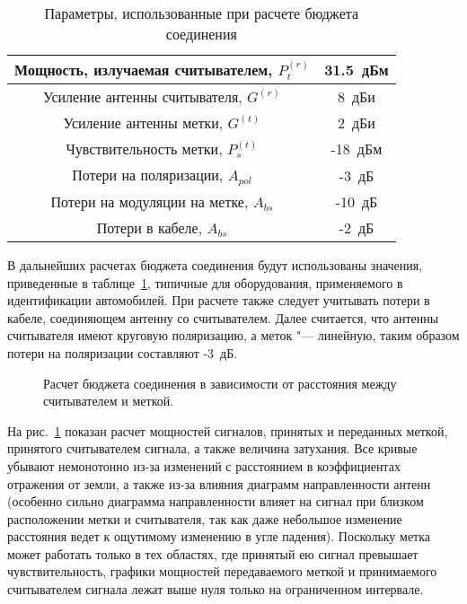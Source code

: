 \begin{table}[!t]
	\renewcommand{\arraystretch}{1.3}
	\caption{Параметры, использованные при расчете бюджета соединения}
	\label{table:ch2_budget_params}
	\centering
	\begin{tabular}{|c|c|}
		\hline
		Мощность, излучаемая считывателем, $P_t^{(r)}$ & 31.5~дБм\\
		\hline
		Усиление антенны считывателя, $G^{(r)}$ & 8~дБи\\
		\hline
		Усиление антенны метки, $G^{(t)}$ & 2~дБи\\
		\hline
		Чувствительность метки, $P_s^{(t)}$ & -18~дБм\\
		\hline
		Потери на поляризации, $A_{pol}$ & -3~дБ\\
		\hline
		Потери на модуляции на метке, $A_{bs}$ & -10~дБ\\
		\hline
		Потери в кабеле, $A_{bs}$ & -2~дБ\\
		\hline
	\end{tabular}
\end{table}

В дальнейших расчетах бюджета соединения будут использованы значения, приведенные в таблице~\ref{table:ch2_budget_params}, типичные для оборудования, применяемого в идентификации автомобилей. При расчете также следует учитывать потери в кабеле, соединяющем антенну со считывателем. Далее считается, что антенны считывателя имеют круговую поляризацию, а меток "--- линейную, таким образом потери на поляризации составляют -3~дБ.

\begin{figure}[!t]
  \caption{Расчет бюджета соединения в зависимости от расстояния между считывателем и меткой.}
  \label{fig:ch2_link_budget}
\end{figure}

На рис.~\ref{fig:ch2_link_budget} показан расчет мощностей сигналов, принятых и переданных меткой, принятого считывателем сигнала, а также величина затухания. Все кривые убывают немонотонно из-за изменений с расстоянием в коэффициентах отражения от земли, а также из-за влияния диаграмм направленности антенн (особенно сильно диаграмма направленности влияет на сигнал при близком расположении метки и считывателя, так как даже небольшое изменение расстояния ведет к ощутимому изменению в угле падения). Поскольку метка может работать только в тех областях, где принятый ею сигнал превышает чувствительность, графики мощностей передаваемого меткой и принимаемого считывателем сигнала лежат выше нуля только на ограниченном интервале.

